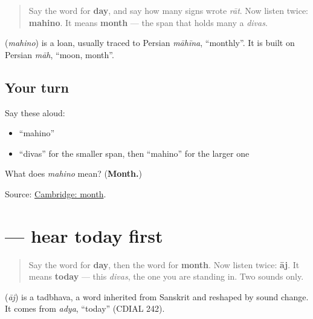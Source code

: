 \begin{quote}
Say the word for \textbf{day}, and say how many signs wrote \emph{rāt}. Now listen twice: \textbf{mahino}. It means \textbf{month} — the span that holds many a \emph{divas}.
\end{quote}

\begin{cousinweb}
\textbf{} (\emph{mahino}) is a loan, usually traced to Persian \emph{māhīna}, \textquotedblleft{}monthly\textquotedblright{}. It is built on Persian \emph{māh}, \textquotedblleft{}moon, month\textquotedblright{}.
\end{cousinweb}

\subsection*{Your turn}
Say these aloud:

\begin{itemize}
\raggedright
  \item \textquotedblleft{}mahino\textquotedblright{}
  \item \textquotedblleft{}divas\textquotedblright{} for the smaller span, then \textquotedblleft{}mahino\textquotedblright{} for the larger one
\end{itemize}

\begin{tcolorbox}[breakable,colback=teal!4,colframe=teal!35!black,title={Before you move on}]
What does \emph{mahino} mean? (\textbf{Month.})

Source: \href{https://dictionary.cambridge.org/dictionary/english-gujarati/month}{Cambridge: month}.
\end{tcolorbox}
\section[\texorpdfstring{\gu{આજ} (āj)}{આજ (āj)}]{ — hear today first}

\label{lesson:GU-C24-hear-aaj}



\begin{quote}
Say the word for \textbf{day}, then the word for \textbf{month}. Now listen twice: \textbf{āj}. It means \textbf{today} — this \emph{divas}, the one you are standing in. Two sounds only.
\end{quote}

\begin{cousinweb}
\textbf{} (\emph{āj}) is a tadbhava, a word inherited from Sanskrit and reshaped by sound change. It comes from \emph{adya}, \textquotedblleft{}today\textquotedblright{} (CDIAL 242).
\end{cousinweb}

